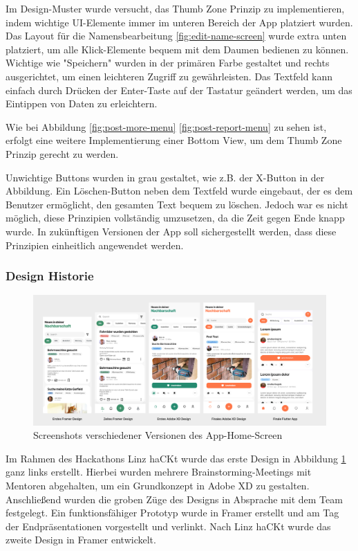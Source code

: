 Im Design-Muster wurde versucht, das Thumb Zone Prinzip zu
implementieren, indem wichtige UI-Elemente immer im unteren
Bereich der App platziert wurden. Das Layout für die
Namensbearbeitung \ref{fig:edit-name-screen} wurde extra
unten platziert, um alle Klick-Elemente bequem mit dem
Daumen bedienen zu können. Wichtige
wie "Speichern"
wurden in der primären Farbe gestaltet und rechts
ausgerichtet, um einen leichteren Zugriff zu gewährleisten.
Das Textfeld kann einfach durch Drücken der Enter-Taste auf
der Tastatur geändert werden, um das Eintippen von Daten zu
erleichtern.

Wie bei Abbildung \ref{fig:post-more-menu} \ref{fig:post-report-menu} zu sehen ist, erfolgt eine weitere Implementierung einer Bottom View, um dem Thumb Zone Prinzip gerecht zu werden.

Unwichtige Buttons wurden in grau gestaltet, wie z.B. der X-Button in der Abbildung. Ein Löschen-Button neben dem Textfeld wurde eingebaut, der es dem Benutzer ermöglicht, den gesamten Text bequem zu löschen. Jedoch war es nicht möglich, diese Prinzipien vollständig umzusetzen, da die Zeit gegen Ende knapp wurde. In zukünftigen Versionen der App soll sichergestellt werden, dass diese Prinzipien einheitlich angewendet werden.
\subsubsection{Design Historie}

\begin{figure}[h]
  \centering
  \includegraphics[width=1\textwidth]{pics/app-design-history.png}
  \caption{Screenshots verschiedener Versionen des App-Home-Screen}
  \label{fig:app-design-history}
\end{figure}
Im Rahmen des Hackathons Linz haCKt wurde das erste Design in Abbildung \ref{fig:app-design-history} ganz links erstellt. Hierbei wurden mehrere Brainstorming-Meetings mit Mentoren abgehalten, um ein Grundkonzept in Adobe XD zu gestalten. Anschließend wurden die groben Züge des Designs in Absprache mit dem Team festgelegt. Ein funktionsfähiger Prototyp wurde in Framer erstellt und am Tag der Endpräsentationen vorgestellt und verlinkt. Nach Linz haCKt wurde das zweite Design in Framer entwickelt.

